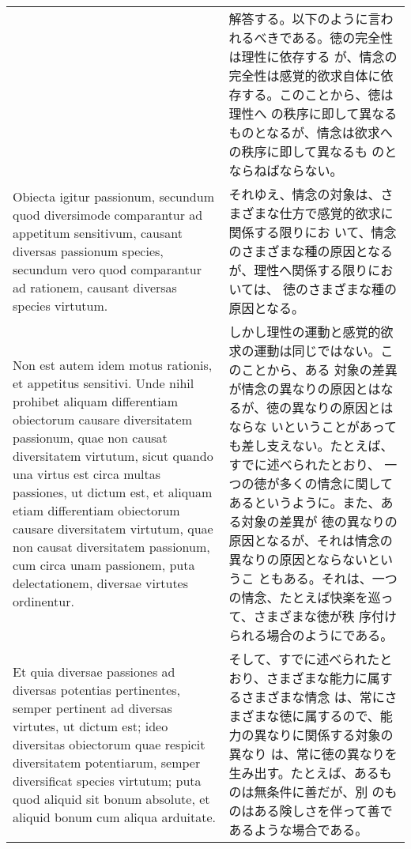 \documentclass[10pt]{jsarticle}
\begin{document}
\begin{longtable}{p{21em}p{21em}}
&

 解答する。以下のように言われるべきである。徳の完全性は理性に依存する
 が、情念の完全性は感覚的欲求自体に依存する。このことから、徳は理性へ
 の秩序に即して異なるものとなるが、情念は欲求への秩序に即して異なるも
 のとならねばならない。
 
\\

 Obiecta igitur passionum, secundum quod diversimode comparantur ad
 appetitum sensitivum, causant diversas passionum species, secundum
 vero quod comparantur ad rationem, causant diversas species
 virtutum. 

&

 それゆえ、情念の対象は、さまざまな仕方で感覚的欲求に関係する限りにお
 いて、情念のさまざまな種の原因となるが、理性へ関係する限りにおいては、
 徳のさまざまな種の原因となる。

 
\\

 Non est autem idem motus rationis, et appetitus sensitivi. Unde nihil
 prohibet aliquam differentiam obiectorum causare diversitatem
 passionum, quae non causat diversitatem virtutum, sicut quando una
 virtus est circa multas passiones, ut dictum est, et aliquam etiam
 differentiam obiectorum causare diversitatem virtutum, quae non
 causat diversitatem passionum, cum circa unam passionem, puta
 delectationem, diversae virtutes ordinentur.

&


 しかし理性の運動と感覚的欲求の運動は同じではない。このことから、ある
 対象の差異が情念の異なりの原因とはなるが、徳の異なりの原因とはならな
 いということがあっても差し支えない。たとえば、すでに述べられたとおり、
 一つの徳が多くの情念に関してあるというように。また、ある対象の差異が
 徳の異なりの原因となるが、それは情念の異なりの原因とならないというこ
 ともある。それは、一つの情念、たとえば快楽を巡って、さまざまな徳が秩
 序付けられる場合のようにである。

 
\\

 Et quia diversae passiones ad diversas potentias pertinentes, semper
 pertinent ad diversas virtutes, ut dictum est; ideo diversitas
 obiectorum quae respicit diversitatem potentiarum, semper
 diversificat species virtutum; puta quod aliquid sit bonum absolute,
 et aliquid bonum cum aliqua arduitate.

&

 そして、すでに述べられたとおり、さまざまな能力に属するさまざまな情念
 は、常にさまざまな徳に属するので、能力の異なりに関係する対象の異なり
 は、常に徳の異なりを生み出す。たとえば、あるものは無条件に善だが、別
 のものはある険しさを伴って善であるような場合である。


\end{longtable}
\end{document}
